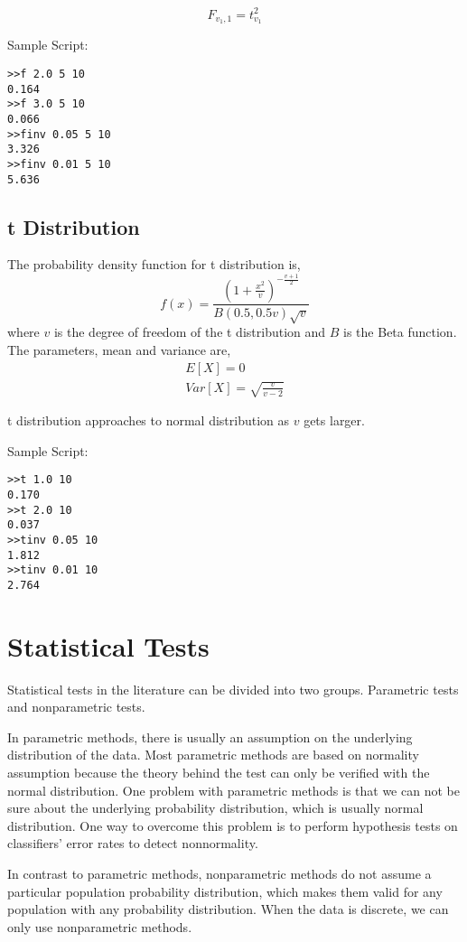 \documentclass[a4paper,12pt]{book}
\begin{document}
\begin{equation}
F_{v_1, 1} = t_{v_1}^2
\end{equation}

Sample Script:
\begin{verbatim}
>>f 2.0 5 10
0.164
>>f 3.0 5 10
0.066
>>finv 0.05 5 10
3.326
>>finv 0.01 5 10
5.636
\end{verbatim}

\subsection{t Distribution}
The probability density function for t distribution is,
\begin{equation}
f(x)=\frac{(1+\frac{x^2}{v})^{-\frac{v+1}{2}}}{B(0.5,0.5v)\sqrt{v}}
\end{equation}
where $v$ is the degree of freedom of the t distribution and $B$ is the Beta function. The parameters, mean and variance are,
\begin{eqnarray}
E[X]=0 \nonumber \\
Var[X]=\sqrt{\frac{v}{v-2}}
\end{eqnarray}

t distribution approaches to normal distribution as $v$ gets larger.

Sample Script:
\begin{verbatim}
>>t 1.0 10
0.170
>>t 2.0 10
0.037
>>tinv 0.05 10
1.812
>>tinv 0.01 10
2.764
\end{verbatim}

\section{Statistical Tests}

Statistical tests in the literature can be divided into two groups. Parametric tests and nonparametric tests.

In parametric methods, there is usually an assumption on the underlying distribution of the data. Most parametric methods are based on normality assumption because the theory behind the test can only be verified with the normal distribution. One problem with parametric methods is that we can not be sure about the underlying probability distribution, which is usually normal distribution. One way to overcome this problem is to perform hypothesis tests on classifiers' error rates to detect nonnormality.

In contrast to parametric methods, nonparametric methods do not assume a particular population probability distribution, which makes them valid for any population with any probability distribution. When the data is discrete, we can only use nonparametric methods.
\end{document}
